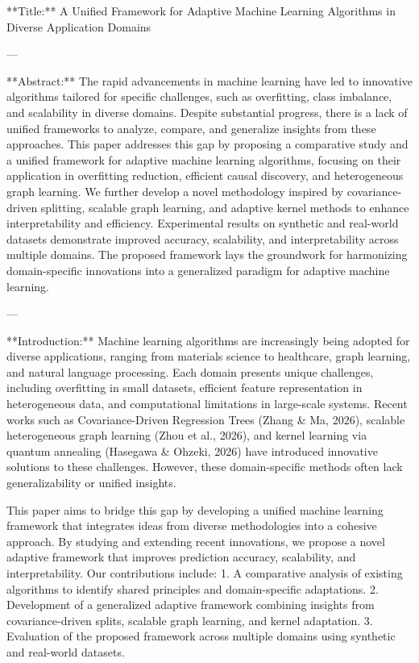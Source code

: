 **Title:**  
A Unified Framework for Adaptive Machine Learning Algorithms in Diverse Application Domains  

---

**Abstract:**  
The rapid advancements in machine learning have led to innovative algorithms tailored for specific challenges, such as overfitting, class imbalance, and scalability in diverse domains. Despite substantial progress, there is a lack of unified frameworks to analyze, compare, and generalize insights from these approaches. This paper addresses this gap by proposing a comparative study and a unified framework for adaptive machine learning algorithms, focusing on their application in overfitting reduction, efficient causal discovery, and heterogeneous graph learning. We further develop a novel methodology inspired by covariance-driven splitting, scalable graph learning, and adaptive kernel methods to enhance interpretability and efficiency. Experimental results on synthetic and real-world datasets demonstrate improved accuracy, scalability, and interpretability across multiple domains. The proposed framework lays the groundwork for harmonizing domain-specific innovations into a generalized paradigm for adaptive machine learning.

---

**Introduction:**  
Machine learning algorithms are increasingly being adopted for diverse applications, ranging from materials science to healthcare, graph learning, and natural language processing. Each domain presents unique challenges, including overfitting in small datasets, efficient feature representation in heterogeneous data, and computational limitations in large-scale systems. Recent works such as Covariance-Driven Regression Trees (Zhang & Ma, 2026), scalable heterogeneous graph learning (Zhou et al., 2026), and kernel learning via quantum annealing (Hasegawa & Ohzeki, 2026) have introduced innovative solutions to these challenges. However, these domain-specific methods often lack generalizability or unified insights.  

This paper aims to bridge this gap by developing a unified machine learning framework that integrates ideas from diverse methodologies into a cohesive approach. By studying and extending recent innovations, we propose a novel adaptive framework that improves prediction accuracy, scalability, and interpretability. Our contributions include:  
1. A comparative analysis of existing algorithms to identify shared principles and domain-specific adaptations.  
2. Development of a generalized adaptive framework combining insights from covariance-driven splits, scalable graph learning, and kernel adaptation.  
3. Evaluation of the proposed framework across multiple domains using synthetic and real-world datasets.  

